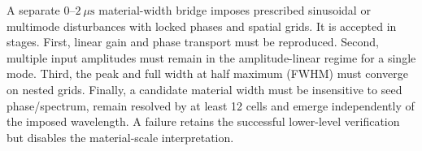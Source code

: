 A separate $0$--$2~\mu\mathrm s$ material-width bridge imposes prescribed sinusoidal or multimode disturbances with locked phases and spatial grids. It is accepted in stages. First, linear gain and phase transport must be reproduced. Second, multiple input amplitudes must remain in the amplitude-linear regime for a single mode. Third, the peak and full width at half maximum (FWHM) must converge on nested grids. Finally, a candidate material width must be insensitive to seed phase/spectrum, remain resolved by at least 12 cells and emerge independently of the imposed wavelength. A failure retains the successful lower-level verification but disables the material-scale interpretation.
